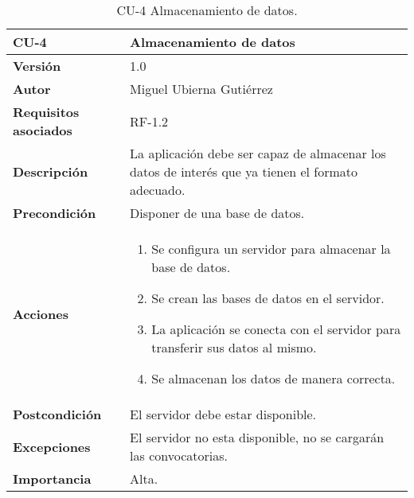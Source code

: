 \begin{table}[p]
	\centering
	\begin{tabularx}{\linewidth}{ p{} p{} }
		\toprule
		\textbf{CU-4}    & \textbf{Almacenamiento de datos}\\
		\toprule
		\textbf{Versión}              & 1.0    \\
		\textbf{Autor}                & Miguel Ubierna Gutiérrez \\
		\textbf{Requisitos asociados} & RF-1.2 \\
		\textbf{Descripción}          & La aplicación debe ser capaz de almacenar los datos de interés que ya tienen el formato adecuado. \\
		\textbf{Precondición}         & Disponer de una base de datos.\\
		\textbf{Acciones}             &
		\begin{enumerate}
			\def\labelenumi{\arabic{enumi}.}
			\tightlist
			\item Se configura un servidor para almacenar la base de datos.
			\item Se crean las bases de datos en el servidor.
                \item La aplicación se conecta con el servidor para transferir sus datos al mismo.
                \item Se almacenan los datos de manera correcta.
		\end{enumerate}\\
		\textbf{Postcondición}        & El servidor debe estar disponible. \\
		\textbf{Excepciones}          & El servidor no esta disponible, no se cargarán las convocatorias.  \\
		\textbf{Importancia}          & Alta.  \\
		\bottomrule
	\end{tabularx}
	\caption{CU-4 Almacenamiento de datos.}
\end{table}

